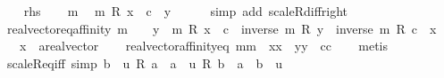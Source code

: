 \begin{isabellebody}
\isamarkupfalse%
\isanewline
\ \ \isamarkupfalse%
\ {\isacharquery}{\kern0pt}rhs\isanewline
\ \ \isamarkupfalse%
\ m{}\ \isamarkupfalse%
\ {\isachardoublequoteopen}m\ {\isacharasterisk}{\kern0pt}\isactrlsub R\ x\ {\isacharplus}{\kern0pt}\ c\ {\isacharequal}{\kern0pt}\ y{\isachardoublequoteclose}\isanewline
\ \ \ \ \isamarkupfalse%
\ {\isacharparenleft}{\kern0pt}simp\ add{\isacharcolon}{\kern0pt}\ scaleR{\isacharunderscore}{\kern0pt}diff{\isacharunderscore}{\kern0pt}right{\isacharparenright}{\kern0pt}\isanewline
{}\isamarkupfalse%
%
\endisatagproof
{\isafoldproof}%
%
\isadelimproof
\isanewline
%
\endisadelimproof
\isanewline
{}\isamarkupfalse%
\ real{\isacharunderscore}{\kern0pt}vector{\isacharunderscore}{\kern0pt}eq{\isacharunderscore}{\kern0pt}affinity{\isacharcolon}{\kern0pt}\ {\isachardoublequoteopen}m\ {\isasymnoteq}\ {}\ {\isasymLongrightarrow}\ y\ {\isacharequal}{\kern0pt}\ m\ {\isacharasterisk}{\kern0pt}\isactrlsub R\ x\ {\isacharplus}{\kern0pt}\ c\ {\isasymlongleftrightarrow}\ inverse\ m\ {\isacharasterisk}{\kern0pt}\isactrlsub R\ y\ {\isacharminus}{\kern0pt}\ {\isacharparenleft}{\kern0pt}inverse\ m\ {\isacharasterisk}{\kern0pt}\isactrlsub R\ c{\isacharparenright}{\kern0pt}\ {\isacharequal}{\kern0pt}\ x{\isachardoublequoteclose}\isanewline
\ \ \ x\ {\isacharcolon}{\kern0pt}{\isacharcolon}{\kern0pt}\ {\isachardoublequoteopen}{\isacharprime}{\kern0pt}a{\isacharcolon}{\kern0pt}{\isacharcolon}{\kern0pt}real{\isacharunderscore}{\kern0pt}vector{\isachardoublequoteclose}\isanewline
%
\isadelimproof
\ \ %
\endisadelimproof
%
\isatagproof
{}\isamarkupfalse%
\ real{\isacharunderscore}{\kern0pt}vector{\isacharunderscore}{\kern0pt}affinity{\isacharunderscore}{\kern0pt}eq{\isacharbrackleft}{\kern0pt}\ m{\isacharequal}{\kern0pt}m\ \ x{\isacharequal}{\kern0pt}x\ \ y{\isacharequal}{\kern0pt}y\ \ c{\isacharequal}{\kern0pt}c{\isacharbrackright}{\kern0pt}\isanewline
\ \ \isamarkupfalse%
\ metis%
\endisatagproof
{\isafoldproof}%
%
\isadelimproof
\isanewline
%
\endisadelimproof
\isanewline
{}\isamarkupfalse%
\ scaleR{\isacharunderscore}{\kern0pt}eq{\isacharunderscore}{\kern0pt}iff\ {\isacharbrackleft}{\kern0pt}simp{\isacharbrackright}{\kern0pt}{\isacharcolon}{\kern0pt}\ {\isachardoublequoteopen}b\ {\isacharplus}{\kern0pt}\ u\ {\isacharasterisk}{\kern0pt}\isactrlsub R\ a\ {\isacharequal}{\kern0pt}\ a\ {\isacharplus}{\kern0pt}\ u\ {\isacharasterisk}{\kern0pt}\isactrlsub R\ b\ {\isasymlongleftrightarrow}\ a\ {\isacharequal}{\kern0pt}\ b\ {\isasymor}\ u\ {\isacharequal}{\kern0pt}\ {}{\isachardoublequoteclose}\isanewline

\end{isabellebody}

